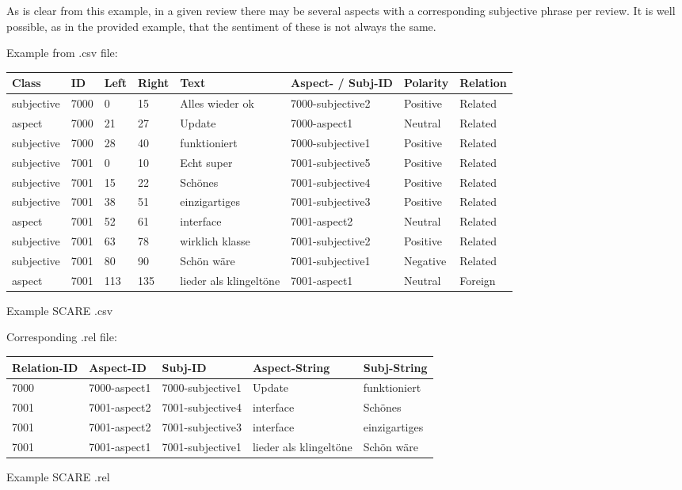 As is clear from this example, in a given review there may be several aspects with a corresponding subjective phrase per review.
It is well possible, as in the provided example, that the sentiment of these is not always the same.

Example from .csv file:

{\begin{tabular}{llllllll}
	Class & ID & Left & Right & Text & Aspect- / Subj-ID & Polarity & Relation  \\
	\hline
	subjective & 7000 & 0 & 15 & Alles wieder ok & 7000-subjective2 & Positive & Related \\
	aspect & 7000 & 21 & 27 & Update & 7000-aspect1 & Neutral & Related \\
	subjective & 7000 & 28 & 40 & funktioniert & 7000-subjective1 & Positive & Related \\
	subjective & 7001 & 0 & 10 & Echt super & 7001-subjective5 & Positive & Related \\
	subjective & 7001 & 15 & 22 & Schönes & 7001-subjective4 & Positive & Related \\
	subjective & 7001 & 38 & 51 & einzigartiges & 7001-subjective3 & Positive & Related \\
	aspect & 7001 & 52 & 61 & interface & 7001-aspect2 & Neutral & Related \\
	subjective & 7001 & 63 & 78 & wirklich klasse & 7001-subjective2 & Positive & Related \\
	subjective & 7001 & 80 & 90 & Schön wäre & 7001-subjective1 & Negative & Related \\
	aspect & 7001 & 113 & 135 & lieder als klingeltöne & 7001-aspect1 & Neutral & Foreign \\
\end{tabular}
}{Example SCARE .csv}

Corresponding .rel file:

{\begin{tabular}{lllll}
	Relation-ID & Aspect-ID & Subj-ID & Aspect-String & Subj-String \\
	\hline
	7000 & 7000-aspect1 & 7000-subjective1 & Update & funktioniert \\
	7001 & 7001-aspect2 & 7001-subjective4 & interface & Schönes \\
	7001 & 7001-aspect2 & 7001-subjective3 & interface & einzigartiges \\
	7001 & 7001-aspect1 & 7001-subjective1 & lieder als klingeltöne & Schön wäre \\
\end{tabular}
}{Example SCARE .rel}


